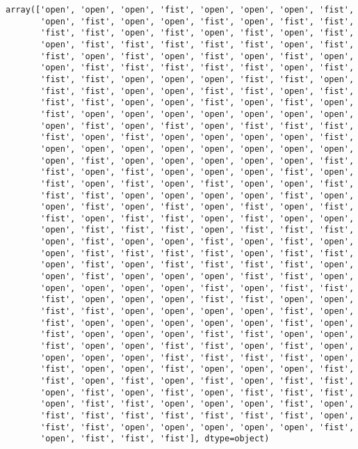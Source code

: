 \documentclass[11pt]{article}
\makeatletter
\newcommand{\boxspacing}{\kern\kvtcb@left@rule\kern\kvtcb@boxsep}
\newcommand{\prompt}[4]{
        {\ttfamily\llap{{\color{#2}[#3]:\hspace{3pt}#4}}\vspace{-\baselineskip}}
    }
\makeatother
\begin{document}
            \begin{tcolorbox}[breakable, size=fbox, boxrule=.5pt, pad at break*=1mm, opacityfill=0]
\prompt{Out}{outcolor}{50}{\boxspacing}
\begin{Verbatim}[commandchars=\\\{\}]
array(['open', 'open', 'open', 'fist', 'open', 'open', 'open', 'fist',
       'open', 'fist', 'open', 'open', 'fist', 'open', 'fist', 'fist',
       'fist', 'fist', 'open', 'fist', 'open', 'fist', 'open', 'fist',
       'open', 'fist', 'fist', 'fist', 'fist', 'fist', 'open', 'fist',
       'fist', 'open', 'fist', 'open', 'fist', 'open', 'fist', 'open',
       'open', 'fist', 'fist', 'fist', 'fist', 'fist', 'open', 'fist',
       'fist', 'fist', 'open', 'open', 'open', 'fist', 'fist', 'open',
       'fist', 'fist', 'open', 'open', 'fist', 'fist', 'open', 'fist',
       'fist', 'fist', 'open', 'open', 'fist', 'open', 'fist', 'open',
       'fist', 'open', 'open', 'open', 'open', 'open', 'open', 'open',
       'open', 'fist', 'open', 'fist', 'open', 'fist', 'fist', 'fist',
       'fist', 'open', 'fist', 'open', 'open', 'open', 'open', 'fist',
       'open', 'open', 'open', 'open', 'open', 'open', 'open', 'open',
       'open', 'fist', 'open', 'open', 'open', 'open', 'open', 'fist',
       'fist', 'open', 'fist', 'open', 'open', 'open', 'fist', 'open',
       'fist', 'open', 'fist', 'open', 'fist', 'open', 'open', 'fist',
       'fist', 'fist', 'open', 'open', 'open', 'open', 'fist', 'open',
       'open', 'fist', 'open', 'fist', 'open', 'fist', 'open', 'fist',
       'fist', 'open', 'fist', 'fist', 'open', 'fist', 'open', 'open',
       'open', 'fist', 'fist', 'fist', 'open', 'fist', 'fist', 'fist',
       'open', 'fist', 'open', 'open', 'fist', 'open', 'fist', 'open',
       'open', 'fist', 'fist', 'fist', 'fist', 'open', 'fist', 'fist',
       'open', 'fist', 'open', 'fist', 'fist', 'fist', 'fist', 'open',
       'open', 'fist', 'open', 'open', 'open', 'fist', 'fist', 'open',
       'open', 'open', 'open', 'open', 'fist', 'open', 'fist', 'fist',
       'fist', 'open', 'open', 'open', 'fist', 'fist', 'open', 'open',
       'fist', 'fist', 'open', 'open', 'open', 'open', 'fist', 'open',
       'fist', 'open', 'open', 'open', 'open', 'open', 'fist', 'open',
       'fist', 'open', 'open', 'open', 'fist', 'fist', 'open', 'open',
       'fist', 'open', 'open', 'fist', 'fist', 'open', 'fist', 'open',
       'open', 'open', 'open', 'fist', 'fist', 'fist', 'fist', 'open',
       'fist', 'open', 'open', 'fist', 'open', 'open', 'open', 'fist',
       'fist', 'open', 'fist', 'open', 'fist', 'open', 'fist', 'fist',
       'open', 'fist', 'open', 'fist', 'open', 'fist', 'fist', 'fist',
       'open', 'fist', 'fist', 'open', 'open', 'open', 'fist', 'open',
       'fist', 'fist', 'fist', 'fist', 'fist', 'fist', 'fist', 'open',
       'fist', 'fist', 'open', 'open', 'open', 'open', 'open', 'fist',
       'open', 'fist', 'fist', 'fist'], dtype=object)
\end{Verbatim}
\end{tcolorbox}
        
\end{document}
